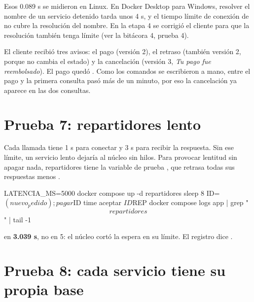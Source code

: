 \documentclass[11pt]{article}
\begin{document}
\begin{nota}
Esos 0.089 s se midieron en Linux. En Docker Desktop para Windows, resolver el nombre de un servicio
detenido tarda unos 4 s, y el tiempo límite de conexión de  no cubre la resolución del
nombre. En la etapa 4 se corrigió el cliente para que la resolución también tenga límite (ver la
bitácora 4, prueba 4).
\end{nota}


\observado El cliente recibió tres avisos: el pago (versión 2), el retraso (también versión 2, porque no
cambia el estado) y la cancelación (versión 3, \emph{Tu pago fue reembolsado}). El pago quedó
. Como los comandos se escribieron a mano, entre el pago y la primera consulta pasó más
de un minuto, por eso la cancelación ya aparece en las dos consultas.

\section{Prueba 7: repartidores lento}

\comofunciona Cada llamada tiene 1 s para conectar y 3 s para recibir la respuesta. Sin ese límite, un
servicio lento dejaría al núcleo sin hilos. Para provocar lentitud sin apagar nada, repartidores tiene
la variable de prueba , que retrasa todas sus respuestas menos .

\begin{comando}
LATENCIA_MS=5000 docker compose up -d repartidores
sleep 8
ID=$(nuevo_pedido); pagar $ID
time aceptar $ID $REP
docker compose logs app | grep "\[repartidores\]" | tail -1
\end{comando}

\observado {} en \textbf{3.039 s}, no en 5: el núcleo cortó la espera en su límite. El registro
dice .

\section{Prueba 8: cada servicio tiene su propia base}
\end{document}
